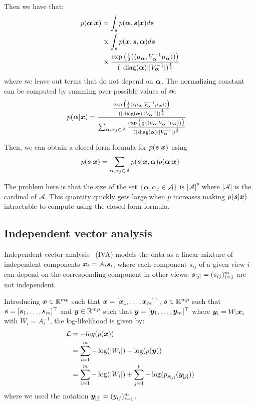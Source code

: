 Then we have that:
\begin{align}
  p(\boldsymbol{\alpha} | \boldsymbol{x}) &= \int_{\boldsymbol{s}} p(\boldsymbol{\alpha}, \boldsymbol{s} | \boldsymbol{x}) d\boldsymbol{s} \\
                    &\propto \int_{\boldsymbol{s}} p(\boldsymbol{x}, \boldsymbol{s} ,\boldsymbol{\alpha}) d\boldsymbol{s} \\ 
                   &\propto \frac{\exp\big(\frac12(\langle{ \mu_{\boldsymbol{\alpha}} },{V_{\boldsymbol{\alpha}}^{-1} \mu_{\boldsymbol{\alpha}} }\rangle) \big)}{(|\operatorname*{diag}(\boldsymbol{\alpha})| |V_{\boldsymbol{\alpha}}^{-1}|)^{\frac12}}\\ 
\end{align}
where we leave out terms that do not depend on $\boldsymbol{\alpha}$.
The normalizing constant can be computed by summing over possible values of
$\boldsymbol{\alpha}$:
\begin{align}
  p(\boldsymbol{\alpha} | \boldsymbol{x}) &= \frac{\frac{\exp\big(\frac12(\langle{ \mu_{\boldsymbol{\alpha}} },{V_{\boldsymbol{\alpha}}^{-1} \mu_{\boldsymbol{\alpha}} }\rangle) \big)}{(|\operatorname*{diag}(\boldsymbol{\alpha})| |V_{\boldsymbol{\alpha}}^{-1}|)^{\frac12}}}{\sum_{\boldsymbol{\alpha}, \alpha_j \in \mathcal{A}} \frac{\exp\big(\frac12(\langle{ \mu_{\boldsymbol{\alpha}} },{V_{\boldsymbol{\alpha}}^{-1} \mu_{\boldsymbol{\alpha}} }\rangle) \big)}{(|\operatorname*{diag}(\boldsymbol{\alpha})| |V_{\boldsymbol{\alpha}}^{-1}|)^{\frac12}}}
\end{align}

Then, we can obtain a closed form formula for $p(\boldsymbol{s} | \boldsymbol{x})$ using
\begin{align}
  p(\boldsymbol{s} | \boldsymbol{x}) = \sum_{\boldsymbol{\alpha}, \alpha_j \in \mathcal{A}} p(\boldsymbol{s} | \boldsymbol{x}, \boldsymbol{\alpha}) p(\boldsymbol{\alpha} | \boldsymbol{x})
\end{align}

The problem here is that the size of the set $\{\boldsymbol{\alpha}, \alpha_j \in
\mathcal{A} \}$ is $|\mathcal{A}|^p$ where $|\mathcal{A}|$ is the cardinal of
$\mathcal{A}$. This quantity quickly gets large when $p$ increases making
$p(\boldsymbol{s} | \boldsymbol{x})$ intractable to compute using the closed form formula.

\subsection{Independent vector analysis}
\label{sec:IVA}
Independent vector analysis~\cite{lee2008independent} (IVA) models the data as a
linear mixture of independent components $\boldsymbol{x}_i = A_i \boldsymbol{s}_i$, where each
component $s_{ij}$ of a given view $i$ can depend on the corresponding component
in other views: $\boldsymbol{s}_{[j]} = (s_{ij})_{i=1}^m$ are not independent.

Introducing $\boldsymbol{x} \in \mathbb{R}^{mp}$ such that $\boldsymbol{x}  = [\boldsymbol{x}_1, \dots, \boldsymbol{x}_m]^{\top}$,
$\boldsymbol{s} \in \mathbb{R}^{mp}$ such that $\boldsymbol{s} = [\boldsymbol{s}_1, \dots, \boldsymbol{s}_m]^{\top}$ and $\boldsymbol{y}
\in \mathbb{R}^{mp}$ such that $\boldsymbol{y} = [\boldsymbol{y}_1, \dots, \boldsymbol{y}_m]^{\top}$ where $\boldsymbol{y}_i = W_i
\boldsymbol{x}_i$ with $W_i = A_i^{-1}$, the
log-likelihood is given by:
\begin{align*}
  \mathcal{L} &= - log(p(\boldsymbol{x})) \\
        &= \sum_{i=1}^m -\log(|W_i|) -\log(p(\boldsymbol{y})) \\
        &= \sum_{i=1}^m - \log(|W_i|) + \sum_{j=1}^p -\log(p_{\boldsymbol{s}_{[j]}}(\boldsymbol{y}_{[j]}))
\end{align*}
where we used the notation $\boldsymbol{y}_{[j]} = (y_{ij})_{i=1}^m$.

